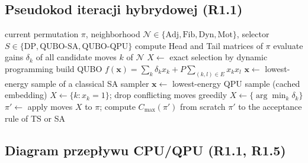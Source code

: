 \documentclass[11pt,a4paper]{article}
\newcommand{\Cmax}{C_{\max}}
\begin{document}
\subsection{Pseudokod iteracji hybrydowej (R1.1)}

\begin{algorithm}[h]
\caption{One iteration of the metaheuristic with a pluggable selection step (sketch)}
\begin{algorithmic}[1]
\Require current permutation $\pi$, neighborhood $\mathcal{N}\in\{\text{Adj},\text{Fib},\text{Dyn},\text{Mot}\}$, selector $S\in\{\text{DP},\text{QUBO-SA},\text{QUBO-QPU}\}$
\State compute Head and Tail matrices of $\pi$ 
\State evaluate gains $\delta_k$ of all candidate moves $k$ of $\mathcal{N}$ 
  \State $X\gets$ exact selection by dynamic programming 
\Else
  \State build QUBO $f(\mathbf{x})=\sum_k\delta_k x_k+P\sum_{(k,l)\in E}x_kx_l$ 
    \State $\mathbf{x}\gets$ lowest-energy sample of a classical SA sampler 
  \Else
    \State $\mathbf{x}\gets$ lowest-energy QPU sample (cached embedding) 
  \EndIf
  \State $X\gets\{k:x_k=1\}$; drop conflicting moves greedily 
\EndIf
{} \State $X\gets\{\arg\min_k\delta_k\}$ \EndIf
\State $\pi'\gets$ apply moves $X$ to $\pi$; compute $\Cmax(\pi')$ from scratch 
\State \Return $\pi'$ to the acceptance rule of TS or SA
\end{algorithmic}
\end{algorithm}

\subsection{Diagram przepływu CPU/QPU (R1.1, R1.5)}
\end{document}
